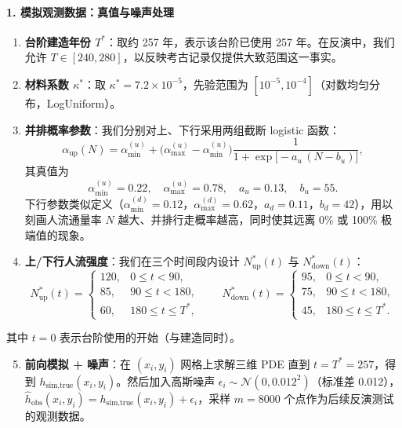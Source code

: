 \documentclass[11pt,a4paper,fontset=windows]{ctexart}
\begin{document}
\paragraph*{1. 模拟观测数据：真值与噪声处理}
\begin{enumerate}
\item \textbf{台阶建造年份 $T^{*}$}：取约 257 年，表示该台阶已使用 257 年。在反演中，我们允许 $T\in[240,280]$，以反映考古记录仅提供大致范围这一事实。
\item \textbf{材料系数 $\kappa^{*}$}：取 $\kappa^{*}=7.2\times10^{-5}$，先验范围为 $[10^{-5},10^{-4}]$（对数均匀分布，LogUniform）。
\item \textbf{并排概率参数}：我们分别对上、下行采用两组截断 logistic 函数：
\[
\alpha_{\text{up}}(N)=\alpha_{\min}^{(u)}
+\bigl(\alpha_{\max}^{(u)}-\alpha_{\min}^{(u)}\bigr)
\frac{1}{1+\exp\bigl[-a_u\,(N-b_u)\bigr]},
\]
其真值为
\[
\alpha_{\min}^{(u)}=0.22,\quad \alpha_{\max}^{(u)}=0.78,\quad a_u=0.13,\quad b_u=55.
\]
下行参数类似定义（$\alpha_{\min}^{(d)}=0.12$，$\alpha_{\max}^{(d)}=0.62$，$a_d=0.11$，$b_d=42$），用以刻画人流通量率 $N$ 越大、并排行走概率越高，同时使其远离 0\% 或 100\% 极端值的现象。
\item \textbf{上/下行人流强度}：我们在三个时间段内设计 $N_{\text{up}}^{*}(t)$ 与 $N_{\text{down}}^{*}(t)$：
\[
N_{\text{up}}^{*}(t)=
\begin{cases}
120, & 0\le t<90,\\
85, & 90\le t<180,\\
60, & 180\le t\le T^{*},
\end{cases}
\qquad
N_{\text{down}}^{*}(t)=
\begin{cases}
95, & 0\le t<90,\\
75, & 90\le t<180,\\
45, & 180\le t\le T^{*}.
\end{cases}
\]
\end{enumerate}

其中 $t=0$ 表示台阶使用的开始（与建造同时）。

\begin{enumerate}\setcounter{enumi}{4}
\item \textbf{前向模拟 + 噪声}：在 $(x_i,y_i)$ 网格上求解三维 PDE 直到 $t=T^{*}=257$，得到 $h_{\text{sim,true}}(x_i,y_i)$。然后加入高斯噪声 $\epsilon_i\sim\mathcal{N}(0,0.012^2)$（标准差 0.012），$\hat{h}_{\text{obs}}(x_i,y_i)=h_{\text{sim,true}}(x_i,y_i)+\epsilon_i$，采样 $m=8000$ 个点作为后续反演测试的观测数据。
\end{enumerate}
\end{document}
